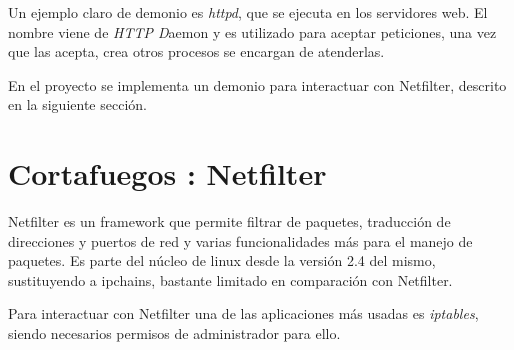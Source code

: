 Un ejemplo claro de demonio es \emph{httpd}, que se ejecuta en los servidores web. El nombre viene de \emph{HTTP D}aemon y es utilizado para aceptar peticiones, una vez que las acepta, crea otros procesos se encargan de atenderlas.
\newline

En el proyecto se implementa un demonio para interactuar con Netfilter, descrito en la siguiente sección.


\section{Cortafuegos : Netfilter}


Netfilter es un framework que permite filtrar de paquetes, traducci\'on de direcciones y puertos de red y varias funcionalidades m\'as para el manejo de paquetes. Es parte del n\'ucleo de linux desde la versi\'on 2.4 del mismo, sustituyendo a ipchains, bastante limitado en comparaci\'on con Netfilter.
\newline
%
%


Para interactuar con Netfilter una de las aplicaciones más usadas es \emph{iptables}, siendo necesarios permisos de administrador para ello.

